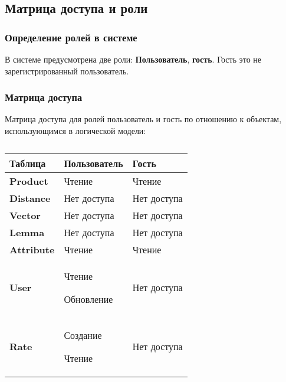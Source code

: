 \subsection{Матрица доступа и роли}

\subsubsection{Определение ролей в системе}

В системе предусмотрена две роли: \textbf{Пользователь}, \textbf{гость}.
Гость это не зарегистрированный пользователь.

\clearpage

\subsubsection{Матрица доступа}

Матрица доступа для ролей пользователь и гость по отношению к объектам,
использующимся в логической модели:

\begin{longtable}{|p{4cm}|p{4cm}|p{4cm}|}
	\caption{} \\
	\hline
	\textbf{Таблица} & \textbf{Пользователь} & \textbf{Гость} \\
	\hline
	\endhead

	\textbf{Product} &
	Чтение &
	Чтение \\ \hline

	\textbf{Distance} &
	Нет доступа &
	Нет доступа \\ \hline

	\textbf{Vector} &
	Нет доступа &
	Нет доступа \\ \hline

	\textbf{Lemma} &
	Нет доступа &
	Нет доступа \\ \hline

	\textbf{Attribute} &
	Чтение &
	Чтение \\ \hline

	\textbf{User} &  Чтение \par Обновление &  Нет доступа \\ \hline

	\textbf{Rate} & Создание \par Чтение & Нет доступа \\ \hline
\end{longtable}